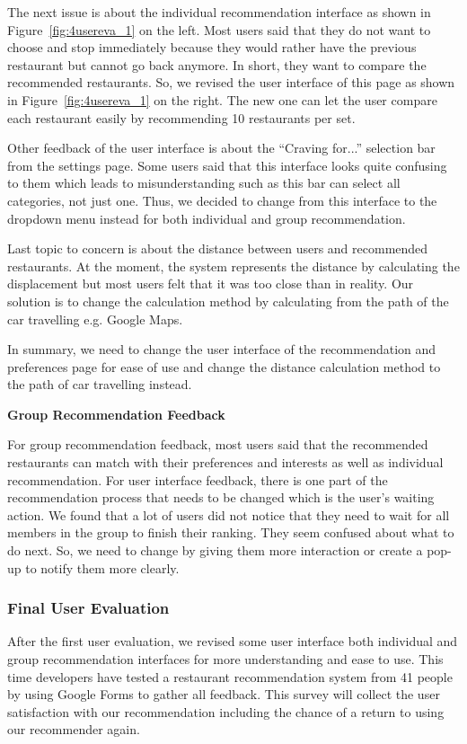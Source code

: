\documentclass[12pt,oneside,openright,a4paper]{cpe-english-project}
\begin{document}
The next issue is about the individual recommendation interface as shown in  Figure~\ref{fig:4usereva_1} on the left. Most users said that they do not want to choose and stop immediately because they would rather have the previous restaurant but cannot go back anymore. In short, they want to compare the recommended restaurants. So, we revised the user interface of this page as shown in Figure~\ref{fig:4usereva_1} on the right. The new one can let the user compare each restaurant easily by recommending 10 restaurants per set.

Other feedback of the user interface is about the “Craving for...” selection bar from the settings page. Some users said that this interface looks quite confusing to them which leads to misunderstanding such as this bar can select all categories, not just one. Thus, we decided to change from this interface to the dropdown menu instead for both individual and group recommendation.

Last topic to concern is about the distance between users and recommended restaurants. At the moment, the system represents the distance by calculating the displacement but most users felt that it was too close than in reality. Our solution is to change the calculation method by calculating from the path of the car travelling e.g. Google Maps.

In summary, we need to change the user interface of the recommendation and preferences page for ease of use and change the distance calculation method to the path of car travelling instead.

\textbf{Group Recommendation Feedback}\par

For group recommendation feedback, most users said that the recommended restaurants can match with their preferences and interests as well as individual recommendation. For user interface feedback, there is one part of the recommendation process that needs to be changed which is the user’s waiting action. We found that a lot of users did not notice that they need to wait for all members in the group to finish their ranking. They seem confused about what to do next. So, we need to change by giving them more interaction or create a pop-up to notify them more clearly.

\subsubsection{Final User Evaluation}

After the first user evaluation, we revised some user interface both individual and group recommendation interfaces for more understanding and ease to use. This time developers have tested a restaurant recommendation system from 41 people by using Google Forms to gather all feedback. This survey will collect the user satisfaction with our recommendation including the chance of a return to using our recommender again.
\end{document}
